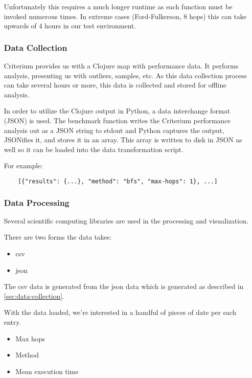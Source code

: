 			Unfortunately this requires a much longer runtime as each function must be invoked numerous times.	In extreme cases (Ford-Fulkerson, 8 hops) this can take upwards of 4 hours in our test environment.
		
			\subsubsection{Data Collection}
			\label{sec:data-collection}
				Criterium provides us with a Clojure map with performance data.	 It performs analysis, presenting us with outliers, samples, etc.  As this data collection process can take several hours or more, this data is collected and stored for offline analysis.
				
				In order to utilize the Clojure output in Python, a data interchange format (JSON) is used.	 The benchmark function writes the Criterium performance analysis out as a JSON string to stdout and Python captures the output, JSONifies it, and stores it in an array.  This array is written to disk in JSON as well so it can be loaded into the data transformation script.
				
				For example:
				
				\begin{verbatim}
	[{"results": {...}, "method": "bfs", "max-hops": 1}, ...]
				\end{verbatim}
			
			\subsubsection{Data Processing}
			\label{sec:data-processing}
				Several scientific computing libraries are used in the processing and visualization.
				
				There are two forms the data takes:
				
				\begin{itemize}
					\item \gls{csv}
					\item \gls{json}
				\end{itemize}
				
				The \gls{csv} data is generated from the \gls{json} data which is generated as described in \vref{sec:data-collection}.
				
				With the data loaded, we're interested in a handful of pieces of date per each entry.
				
				\begin{itemize}
					\item Max hops
					\item Method
					\item Mean execution time
				\end{itemize}
				
